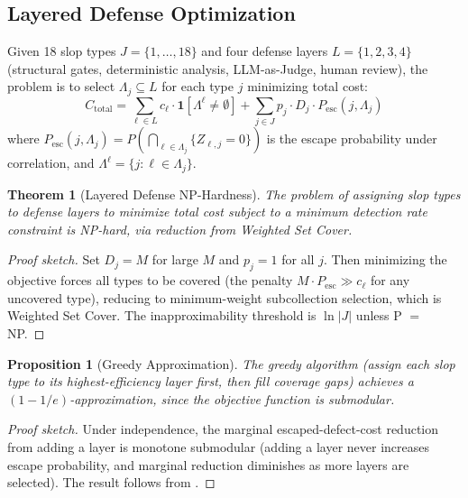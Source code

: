 \documentclass[11pt, a4paper, logo, copyright]{googledeepmind}
\newtheorem{theorem}{Theorem}[section]
\newtheorem{proposition}{Proposition}[section]
\begin{document}
\subsection{Layered Defense Optimization}

Given 18 slop types $J = \{1, \ldots, 18\}$ and four defense layers $L = \{1, 2, 3, 4\}$ (structural gates, deterministic analysis, LLM-as-Judge, human review), the problem is to select $\Lambda_j \subseteq L$ for each type $j$ minimizing total cost:
\begin{equation}
C_{\mathrm{total}} = \sum_{\ell \in L} c_\ell \cdot \mathbf{1}[\Lambda^\ell \neq \emptyset] + \sum_{j \in J} p_j \cdot D_j \cdot P_{\mathrm{esc}}(j, \Lambda_j)
\end{equation}
where $P_{\mathrm{esc}}(j, \Lambda_j) = P(\bigcap_{\ell \in \Lambda_j} \{Z_{\ell,j} = 0\})$ is the escape probability under correlation, and $\Lambda^\ell = \{j : \ell \in \Lambda_j\}$.

\begin{theorem}[Layered Defense NP-Hardness]
\label{thm:defense-nphard}
The problem of assigning slop types to defense layers to minimize total cost subject to a minimum detection rate constraint is NP-hard, via reduction from Weighted Set Cover.
\end{theorem}

\begin{proof}[Proof sketch]
Set $D_j = M$ for large $M$ and $p_j = 1$ for all $j$. Then minimizing the objective forces all types to be covered (the penalty $M \cdot P_{\mathrm{esc}} \gg c_\ell$ for any uncovered type), reducing to minimum-weight subcollection selection, which is Weighted Set Cover. The inapproximability threshold is $\ln |J|$ unless P $=$ NP.
\end{proof}

\begin{proposition}[Greedy Approximation]
\label{prop:greedy-defense}
The greedy algorithm (assign each slop type to its highest-efficiency layer first, then fill coverage gaps) achieves a $(1-1/e)$-approximation, since the objective function is submodular.
\end{proposition}

\begin{proof}[Proof sketch]
Under independence, the marginal escaped-defect-cost reduction from adding a layer is monotone submodular (adding a layer never increases escape probability, and marginal reduction diminishes as more layers are selected). The result follows from \citet{nemhauser1978}.
\end{proof}
\end{document}
